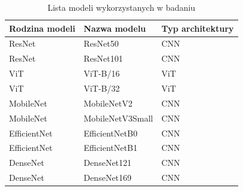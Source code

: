 \begin{table}[H]
	\centering
	\begin{tabular}{|l|l|l|}
		\hline
		Rodzina modeli & Nazwa modelu      & Typ architektury \\ \hline
		ResNet         & ResNet50                          & CNN              \\ \hline
		ResNet         & ResNet101                        & CNN              \\ \hline
		ViT          & ViT-B/16                         & ViT               \\ \hline
		ViT          & ViT-B/32                        & ViT               \\ \hline
		MobileNet      & MobileNetV2                       & CNN              \\ \hline
		MobileNet      & MobileNetV3Small                  & CNN              \\ \hline
		EfficientNet   & EfficientNetB0                   & CNN              \\ \hline
		EfficientNet   & EfficientNetB1                    & CNN              \\ \hline
				DenseNet   & DenseNet121                   & CNN              \\ \hline
					DenseNet	   & DenseNet169                   & CNN              \\ \hline
		
	\end{tabular}
\caption{Lista modeli wykorzystanych w badaniu}
\label{tab:model_list}
\end{table}

